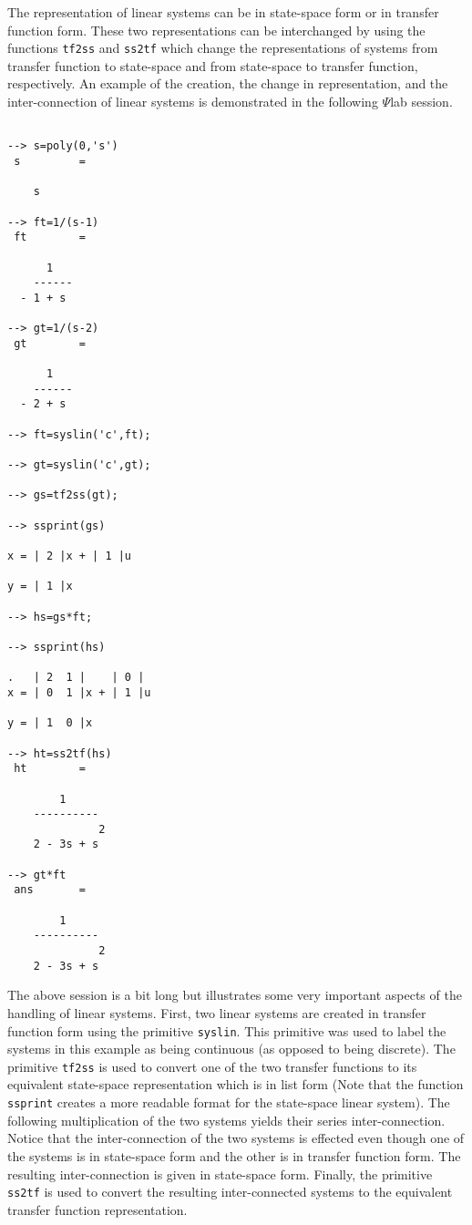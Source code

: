 	The representation of linear systems can be in state-space
form or in transfer function form.  These two representations can
be interchanged by using the functions 
{\tt tf2ss} and 
{\tt ss2tf}
which change the representations of systems from transfer function
to state-space and from state-space to transfer function, respectively.
An example of the creation, the change in representation, and the
inter-connection of linear systems is demonstrated in the following
$\Psi$lab session.
\begin{verbatim}
 
--> s=poly(0,'s')
 s         =
 
    s   
 
--> ft=1/(s-1)
 ft        =
 
      1     
    ------  
  - 1 + s   
 
--> gt=1/(s-2)
 gt        =
 
      1     
    ------  
  - 2 + s   
 
--> ft=syslin('c',ft);
 
--> gt=syslin('c',gt);
 
--> gs=tf2ss(gt);

--> ssprint(gs)
 
x = | 2 |x + | 1 |u   
 
y = | 1 |x   
 
--> hs=gs*ft;
 
--> ssprint(hs)
 
.   | 2  1 |    | 0 |    
x = | 0  1 |x + | 1 |u   
 
y = | 1  0 |x   
 
--> ht=ss2tf(hs)
 ht        =
 
        1        
    ----------   
              2  
    2 - 3s + s   
 
--> gt*ft
 ans       =
 
        1        
    ----------   
              2  
    2 - 3s + s   

\end{verbatim}
The above session is a bit long but illustrates some very important
aspects of the handling of linear systems.  First, two linear systems
are created in transfer function form using the primitive 
{\tt syslin}.
This primitive was used to label the systems in this example 
as being continuous (as opposed to
being discrete).  The primitive {\tt tf2ss} is used to convert one of the
two transfer functions to its equivalent state-space representation
which is in list form (Note that the function {\tt ssprint} creates a more
readable format for the state-space linear system).
The following multiplication of the two systems yields their
series inter-connection.  Notice that the inter-connection 
of the two systems is effected even though one of the systems is
in state-space form and the other is in transfer function form.
The resulting inter-connection is given in state-space form.
Finally, the primitive {\tt ss2tf} is used to convert the resulting
inter-connected systems to the equivalent transfer function representation.

